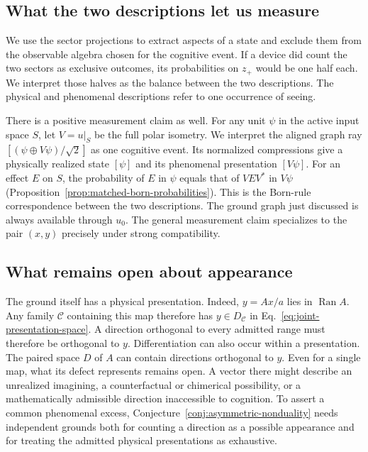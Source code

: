 \documentclass[11pt]{article}
\theoremstyle{definition}
\DeclareMathOperator{\Ran}{Ran}
\begin{document}
\subsection{What the two descriptions let us measure}
\label{subsec:cognitive-ground-measurement}

We use the sector projections to extract aspects of a state and exclude them from the observable algebra chosen for the cognitive event. If a device did count the two sectors as exclusive outcomes, its probabilities on $z_+$ would be one half each. We interpret those halves as the balance between the two descriptions. The physical and phenomenal descriptions refer to one occurrence of seeing.

There is a positive measurement claim as well. For any unit $\psi$ in the active input space $S$, let $V=u|_S$ be the full polar isometry. We interpret the aligned graph ray $[(\psi\oplus V\psi)/\sqrt2]$ as one cognitive event. Its normalized compressions give a physically realized state $[\psi]$ and its phenomenal presentation $[V\psi]$. For an effect $E$ on $S$, the probability of $E$ in $\psi$ equals that of $VEV^*$ in $V\psi$ (Proposition~\ref{prop:matched-born-probabilities}). This is the Born-rule correspondence between the two descriptions. The ground graph just discussed is always available through $u_0$. The general measurement claim specializes to the pair $(x,y)$ precisely under strong compatibility.

\subsection{What remains open about appearance}
\label{subsec:cognitive-ground-excess}

The ground itself has a physical presentation. Indeed, $y=Ax/a$ lies in $\Ran A$. Any family $\mathcal C$ containing this map therefore has $y\in D_{\mathcal C}$ in Eq.~\eqref{eq:joint-presentation-space}. A direction orthogonal to every admitted range must therefore be orthogonal to $y$. Differentiation can also occur within a presentation. The paired space $D$ of $A$ can contain directions orthogonal to $y$. Even for a single map, what its defect represents remains open. A vector there might describe an unrealized imagining, a counterfactual or chimerical possibility, or a mathematically admissible direction inaccessible to cognition. To assert a common phenomenal excess, Conjecture~\ref{conj:asymmetric-nonduality} needs independent grounds both for counting a direction as a possible appearance and for treating the admitted physical presentations as exhaustive.
\end{document}

